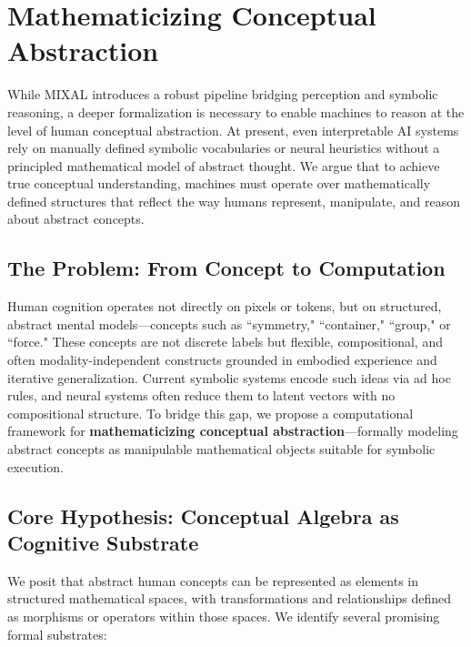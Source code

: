 \documentclass[12pt]{article}
\begin{document}
\section{Mathematicizing Conceptual Abstraction}

While MIXAL introduces a robust pipeline bridging perception and symbolic reasoning, a deeper formalization is necessary to enable machines to reason at the level of human conceptual abstraction. At present, even interpretable AI systems rely on manually defined symbolic vocabularies or neural heuristics without a principled mathematical model of abstract thought. We argue that to achieve true conceptual understanding, machines must operate over mathematically defined structures that reflect the way humans represent, manipulate, and reason about abstract concepts.

\subsection{The Problem: From Concept to Computation}

Human cognition operates not directly on pixels or tokens, but on structured, abstract mental models—concepts such as ``symmetry," ``container," ``group," or ``force." These concepts are not discrete labels but flexible, compositional, and often modality-independent constructs grounded in embodied experience and iterative generalization. Current symbolic systems encode such ideas via ad hoc rules, and neural systems often reduce them to latent vectors with no compositional structure. To bridge this gap, we propose a computational framework for \textbf{mathematicizing conceptual abstraction}—formally modeling abstract concepts as manipulable mathematical objects suitable for symbolic execution.

\subsection{Core Hypothesis: Conceptual Algebra as Cognitive Substrate}

We posit that abstract human concepts can be represented as elements in structured mathematical spaces, with transformations and relationships defined as morphisms or operators within those spaces. We identify several promising formal substrates:
\end{document}

